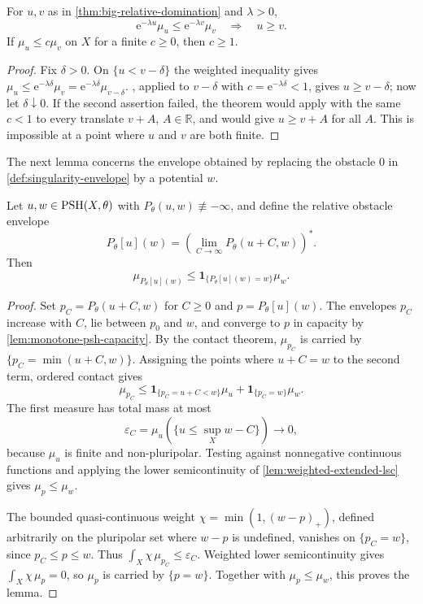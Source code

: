\begin{corollary}\label{cor:big-relative-orders}
For $u,v$ as in \cref{thm:big-relative-domination} and $\lambda>0$,
\[
 \mathrm{e}^{-\lambda u}\mu_u\leq\mathrm{e}^{-\lambda v}\mu_v
 \quad\Longrightarrow\quad u\geq v.
\]
If $\mu_u\leq c\mu_v$ on $X$ for a finite $c\geq0$, then $c\geq1$.
\end{corollary}
\begin{proof}
Fix $\delta>0$. On $\{u<v-\delta\}$ the weighted inequality gives $\mu_u\leq\mathrm{e}^{-\lambda\delta}\mu_v=\mathrm{e}^{-\lambda\delta}\mu_{v-\delta}$. , applied to $v-\delta$ with $c=\mathrm{e}^{-\lambda\delta}<1$, gives $u\geq v-\delta$; now let $\delta\downarrow0$. If the second assertion failed, the theorem would apply with the same $c<1$ to every translate $v+A$, $A\in\mathbb R$, and would give $u\geq v+A$ for all $A$. This is impossible at a point where $u$ and $v$ are both finite.
\end{proof}

The next lemma concerns the envelope obtained by replacing the obstacle $0$ in \cref{def:singularity-envelope} by a potential $w$.

\begin{lemma}\label{lem:relative-obstacle-contact}
Let $u,w\in\mathrm{PSH}(X,\theta)$ with $P_\theta(u,w)\not\equiv-\infty$, and define the relative obstacle envelope
\[
 P_\theta[u](w)=\left(\lim_{C\to\infty}P_\theta(u+C,w)\right)^*.
\]
Then
\[
 \mu_{P_\theta[u](w)}
 \leq\mathbf1_{\{P_\theta[u](w)=w\}}\mu_w.
\]
\end{lemma}
\begin{proof}
Set $p_C=P_\theta(u+C,w)$ for $C\geq0$ and $p=P_\theta[u](w)$. The envelopes $p_C$ increase with $C$, lie between $p_0$ and $w$, and converge to $p$ in capacity by \cref{lem:monotone-psh-capacity}. By the contact theorem, $\mu_{p_C}$ is carried by $\{p_C=\min(u+C,w)\}$. Assigning the points where $u+C=w$ to the second term, ordered contact gives
\[
 \mu_{p_C}\leq\mathbf1_{\{p_C=u+C<w\}}\mu_u
                    +\mathbf1_{\{p_C=w\}}\mu_w.
\]
The first measure has total mass at most
\[
 \varepsilon_C=\mu_u(\{u\leq\sup_Xw-C\})\longrightarrow0,
\]
because $\mu_u$ is finite and non-pluripolar. Testing against nonnegative continuous functions and applying the lower semicontinuity of \cref{lem:weighted-extended-lsc} gives $\mu_p\leq\mu_w$.

The bounded quasi-continuous weight $\chi=\min(1,(w-p)_+)$, defined arbitrarily on the pluripolar set where $w-p$ is undefined, vanishes on $\{p_C=w\}$, since $p_C\leq p\leq w$. Thus $\int_X\chi\,\mu_{p_C}\leq\varepsilon_C$. Weighted lower semicontinuity gives $\int_X\chi\,\mu_p=0$, so $\mu_p$ is carried by $\{p=w\}$. Together with $\mu_p\leq\mu_w$, this proves the lemma.
\end{proof}

